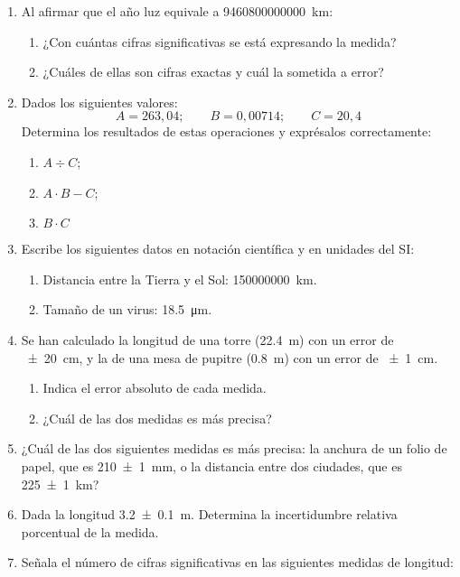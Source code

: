 \documentclass[
]{article}
\providecommand{\tightlist}{%
  \setlength{\itemsep}{0pt}\setlength{\parskip}{0pt}}
\begin{document}
\begin{enumerate}
  \begin{enumerate}
  \def\labelenumii{\alph{enumii})}
  \tightlist
  \item
    \(m_1 =\) \SI{5}{\kg} y \(m_2 =\) \SI{6}{\kg}
  \item
    \(\vec{v}_1 = 3\vec{i} - 2\vec{j}\) y
    \(\vec{v}_2 = -2\vec{i} + 2\vec{j}\)
  \end{enumerate}
\item
  Al afirmar que el año luz equivale a \SI{9460800000000}{\km}:

  \begin{enumerate}
  \def\labelenumii{\alph{enumii})}
  \tightlist
  \item
    ¿Con cuántas cifras significativas se está expresando la medida?
  \item
    ¿Cuáles de ellas son cifras exactas y cuál la sometida a error?
  \end{enumerate}
\item
  Dados los siguientes valores:
  \[A = 263,04; \qquad B = 0,00714; \qquad C = 20,4\] Determina los
  resultados de estas operaciones y exprésalos correctamente:

  \begin{enumerate}
  \def\labelenumii{\alph{enumii})}
  \tightlist
  \item
    \(A \div C\);
  \item
    \(A \cdot B - C\);
  \item
    \(B \cdot C\)
  \end{enumerate}
\item
  Escribe los siguientes datos en notación científica y en unidades del
  SI:

  \begin{enumerate}
  \def\labelenumii{\alph{enumii})}
  \tightlist
  \item
    Distancia entre la Tierra y el Sol: \SI{150000000}{\km}.
  \item
    Tamaño de un virus: \SI{18,5}{\um}.
  \end{enumerate}
\item
  Se han calculado la longitud de una torre (\SI{22,4}{\m}) con un error
  de \SI{+-20}{\cm}, y la de una mesa de pupitre (\SI{0,8}{\m}) con un
  error de \SI{+-1}{\cm}.

  \begin{enumerate}
  \def\labelenumii{\alph{enumii})}
  \tightlist
  \item
    Indica el error absoluto de cada medida.
  \item
    ¿Cuál de las dos medidas es más precisa?
  \end{enumerate}
\item
  ¿Cuál de las dos siguientes medidas es más precisa: la anchura de un
  folio de papel, que es \SI{210 +- 1}{\mm}, o la distancia entre dos
  ciudades, que es \SI{225 +- 1}{\km}?
\item
  Dada la longitud \SI{3.2 +- 0.1}{\m}. Determina la incertidumbre
  relativa porcentual de la medida.
\item
  Señala el número de cifras significativas en las siguientes medidas de
  longitud:


\end{enumerate}
\end{document}
